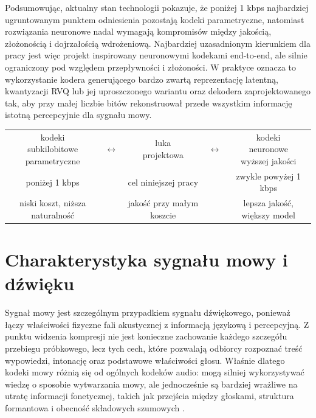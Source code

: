 Podsumowując, aktualny stan technologii pokazuje, że poniżej 1 kbps najbardziej ugruntowanym punktem odniesienia pozostają kodeki parametryczne, natomiast rozwiązania neuronowe nadal wymagają kompromisów między jakością, złożonością i dojrzałością wdrożeniową. Najbardziej uzasadnionym kierunkiem dla pracy jest więc projekt inspirowany neuronowymi kodekami end-to-end, ale silnie ograniczony pod względem przepływności i złożoności. W praktyce oznacza to wykorzystanie kodera generującego bardzo zwartą reprezentację latentną, kwantyzacji RVQ lub jej uproszczonego wariantu oraz dekodera zaprojektowanego tak, aby przy małej liczbie bitów rekonstruował przede wszystkim informację istotną percepcyjnie dla sygnału mowy.

\begin{center}
\centering
\footnotesize
\setlength{\tabcolsep}{2pt}
\begin{tabular}{c c c c c}
\fbox{\parbox{0.20\textwidth}{\centering kodeki\\subkilobitowe\\parametryczne}} &
\(\longleftrightarrow\) &
\fbox{\parbox{0.20\textwidth}{\centering luka\\projektowa}} &
\(\longleftrightarrow\) &
\fbox{\parbox{0.20\textwidth}{\centering kodeki\\neuronowe\\wyższej jakości}} \\
poniżej 1 kbps & & cel niniejszej pracy & & zwykle powyżej 1 kbps \\
niski koszt, niższa naturalność & & jakość przy małym koszcie & & lepsza jakość, większy model \\
\end{tabular}
\label{fig:luka-technologiczna}
\end{center}

\section{Charakterystyka sygnału mowy i dźwięku}
\label{sec:charakterystyka-sygnalu-mowy}

Sygnał mowy jest szczególnym przypadkiem sygnału dźwiękowego, ponieważ łączy właściwości fizyczne fali akustycznej z informacją językową i percepcyjną. Z punktu widzenia kompresji nie jest konieczne zachowanie każdego szczegółu przebiegu próbkowego, lecz tych cech, które pozwalają odbiorcy rozpoznać treść wypowiedzi, intonację oraz podstawowe właściwości głosu. Właśnie dlatego kodeki mowy różnią się od ogólnych kodeków audio: mogą silniej wykorzystywać wiedzę o sposobie wytwarzania mowy, ale jednocześnie są bardziej wrażliwe na utratę informacji fonetycznej, takich jak przejścia między głoskami, struktura formantowa i obecność składowych szumowych \cite{RabinerSchafer2011SpeechDSP,Stevens1998AcousticPhonetics}.

